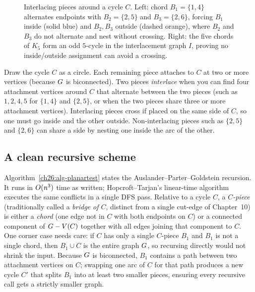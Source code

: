 \begin{figure}[htbp]
\caption{Interlacing pieces around a cycle $C$. Left: chord $B_1=\{1,4\}$ alternates endpoints with $B_2=\{2,5\}$ and $B_3=\{2,6\}$, forcing $B_1$ inside (solid blue) and $B_2,B_3$ outside (dashed orange), where $B_2$ and $B_3$ do not alternate and nest without crossing. Right: the five chords of $K_5$ form an odd $5$-cycle in the interlacement graph $I$, proving no inside/outside assignment can avoid a crossing.}
\label{fig:ch26-interlacement}
\end{figure}

\begin{intuitionbox}
Draw the cycle $C$ as a circle. Each remaining piece attaches to $C$ at two or more
vertices (because $G$ is biconnected). Two pieces \emph{interlace} when you can find
four attachment vertices around $C$ that alternate between the two pieces (such as
$1,2,4,5$ for $\{1,4\}$ and $\{2,5\}$, or when the two pieces share three or more
attachment vertices). Interlacing pieces cross if placed on the same side of $C$, so one
must go inside and the other outside. Non-interlacing pieces such as $\{2,5\}$ and $\{2,6\}$
can share a side by nesting one inside the arc of the other.
\end{intuitionbox}

\subsection{A clean recursive scheme}

Algorithm~\ref{ch26:alg-planartest} states the Auslander--Parter--Goldstein recursion. It
runs in $O(n^3)$ time as written; Hopcroft--Tarjan's linear-time algorithm executes the
same conflicts in a single DFS pass. Relative to a cycle $C$, a \emph{$C$-piece}
(traditionally called a \emph{bridge of $C$}, distinct from a single cut-edge of Chapter~10)
is either a \emph{chord} (one edge not in $C$ with both endpoints on $C$) or a connected
component of $G - V(C)$ together with all edges joining that component to $C$. One corner
case needs care: if $C$ has only a single $C$-piece $B_1$ and $B_1$ is not a single chord,
then $B_1 \cup C$ is the entire graph $G$, so recursing directly would not shrink the
input. Because $G$ is biconnected, $B_1$ contains a path between two attachment vertices
on $C$; swapping one arc of $C$ for that path produces a new cycle $C'$ that splits $B_1$
into at least two smaller pieces, ensuring every recursive call gets a strictly smaller
graph.

